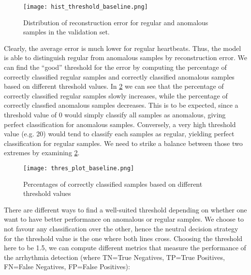 \begin{figure}[H]
    \centering
    \texttt{[image: hist\_threshold\_baseline.png]}
    \caption{Distribution of reconstruction error for regular and anomalous samples in the validation set.}\label{fig:distr_err_baseline}
\end{figure}
Clearly, the average error is much lower for regular heartbeats. Thus, the model is able to distinguish regular from anomalous samples by reconstruction error. We can find the ``good'' threshold for the error by computing the percentage of correctly classified regular samples and correctly classified anomalous samples based on different threshold values. In \cref{fig:thres_baseline} we can see that the percentage of correctly classified regular samples slowly increases, while the percentage of correctly classfied anomalous samples decreases. This is to be expected, since a threshold value of 0 would simply classify all samples as anomalous, giving perfect classification for anomalous samples. Conversely, a very high threshold value (e.g. 20) would tend to classify each samples as regular, yielding perfect classification for regular samples. We need to strike a balance between those two extremes by examining \cref{fig:thres_baseline}.

\begin{figure}[h]
    \centering
    \texttt{[image: thres\_plot\_baseline.png]}
    \caption{Percentages of correctly classified samples based on different threshold values}
    \label{fig:thres_baseline}
\end{figure}

There are different ways to find a well-suited threshold depending on whether one want to have better performance on anomalous or regular samples. We choose to not favour any classification over the other, hence the neutral decision strategy for the threshold value is the one where both lines cross. Choosing the threshold here to be 1.5, we can compute different metrics that measure the performance of the arrhythmia detection (where TN=True Negatives, TP=True Positives, FN=False Negatives, FP=False Positives):


